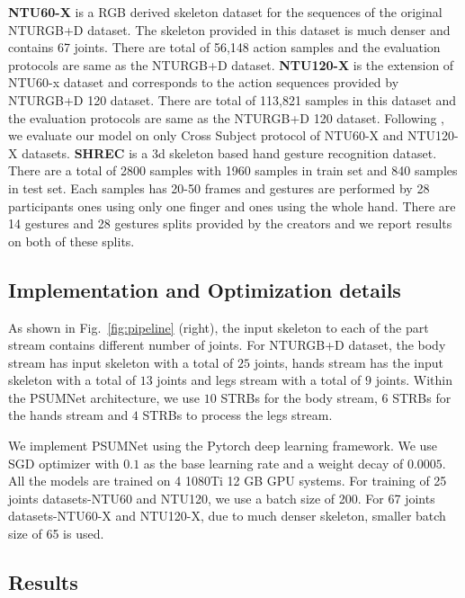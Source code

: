 \documentclass[runningheads]{llncs}
\begin{document}
\noindent\textbf{NTU60-X\cite{trivedi2021ntux}} is a RGB derived skeleton dataset for the sequences of the original NTURGB+D dataset. The skeleton provided in this dataset is much denser and contains 67 joints. There are total of 56,148 action samples and the evaluation protocols are same as the NTURGB+D dataset.
\newline
\noindent\textbf{NTU120-X\cite{trivedi2021ntux}} is the extension of NTU60-x dataset and corresponds to the action sequences provided by NTURGB+D 120 dataset. There are total of 113,821 samples in this dataset and the evaluation protocols are same as the NTURGB+D 120 dataset. Following \cite{trivedi2021ntux}, we evaluate our model on only Cross Subject protocol of NTU60-X and NTU120-X datasets.
\newline
\noindent\textbf{SHREC\cite{de20173d}} is a 3d skeleton based hand gesture recognition dataset. There are a total of 2800 samples with 1960 samples in train set and 840 samples in test set. Each samples has 20-50 frames and gestures are performed by 28 participants ones using only one finger and ones using the whole hand. There are 14 gestures and 28 gestures splits provided by the creators and we report results on both of these splits.



\subsection{Implementation and Optimization details}

As shown in Fig.~\ref{fig:pipeline} (right), the input skeleton to each of the part stream contains different number of joints. For NTURGB+D dataset, the body stream has input skeleton with a total of $25$ joints, hands stream has the input skeleton with a total of $13$ joints and legs stream with a total of $9$ joints. Within the PSUMNet architecture, we use $10$ STRBs for the body stream, $6$ STRBs for the hands stream and $4$ STRBs to process the legs stream.

We implement PSUMNet using the Pytorch deep learning framework. We use SGD optimizer with $0.1$ as the base learning rate and a weight decay of $0.0005$. All the models are trained on 4 1080Ti 12 GB GPU systems. For training of 25 joints datasets-NTU60 and NTU120, we use a batch size of 200. For 67 joints datasets-NTU60-X and NTU120-X, due to much denser skeleton, smaller batch size of 65 is used. 


\subsection{Results}
\label{sec:results}
\end{document}
